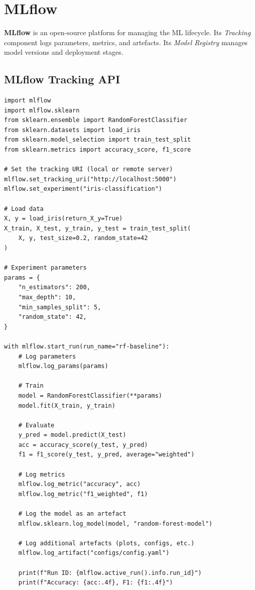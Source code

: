 \section{MLflow}
\label{sec:mlflow}

\textbf{MLflow} is an open-source platform for managing the
ML lifecycle. Its \emph{Tracking} component logs parameters, metrics, and
artefacts. Its \emph{Model Registry} manages model versions and deployment
stages.

\subsection{MLflow Tracking API}

\begin{codeblock}[title=\textbf{Complete MLflow tracking example}]
\begin{verbatim}
import mlflow
import mlflow.sklearn
from sklearn.ensemble import RandomForestClassifier
from sklearn.datasets import load_iris
from sklearn.model_selection import train_test_split
from sklearn.metrics import accuracy_score, f1_score

# Set the tracking URI (local or remote server)
mlflow.set_tracking_uri("http://localhost:5000")
mlflow.set_experiment("iris-classification")

# Load data
X, y = load_iris(return_X_y=True)
X_train, X_test, y_train, y_test = train_test_split(
    X, y, test_size=0.2, random_state=42
)

# Experiment parameters
params = {
    "n_estimators": 200,
    "max_depth": 10,
    "min_samples_split": 5,
    "random_state": 42,
}

with mlflow.start_run(run_name="rf-baseline"):
    # Log parameters
    mlflow.log_params(params)

    # Train
    model = RandomForestClassifier(**params)
    model.fit(X_train, y_train)

    # Evaluate
    y_pred = model.predict(X_test)
    acc = accuracy_score(y_test, y_pred)
    f1 = f1_score(y_test, y_pred, average="weighted")

    # Log metrics
    mlflow.log_metric("accuracy", acc)
    mlflow.log_metric("f1_weighted", f1)

    # Log the model as an artefact
    mlflow.sklearn.log_model(model, "random-forest-model")

    # Log additional artefacts (plots, configs, etc.)
    mlflow.log_artifact("configs/config.yaml")

    print(f"Run ID: {mlflow.active_run().info.run_id}")
    print(f"Accuracy: {acc:.4f}, F1: {f1:.4f}")
\end{verbatim}
\end{codeblock}

